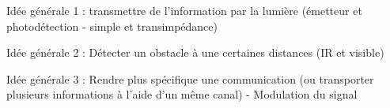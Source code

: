 \documentclass[a4paper,french]{paper}
\author{Julien VILLEMEJANE}
\subtitle{Bloc3}
\title{\titre}
\begin{document}
 
\enteteThematiqueObligatoire{}


Idée générale 1 : transmettre de l'information par la lumière (émetteur et photodétection - simple et transimpédance)

Idée générale 2 : Détecter un obstacle à une certaines distances (IR et visible)

Idée générale 3 : Rendre plus spécifique une communication (ou transporter plusieurs informations à l'aide d'un même canal) - Modulation du signal




%
\end{document}
